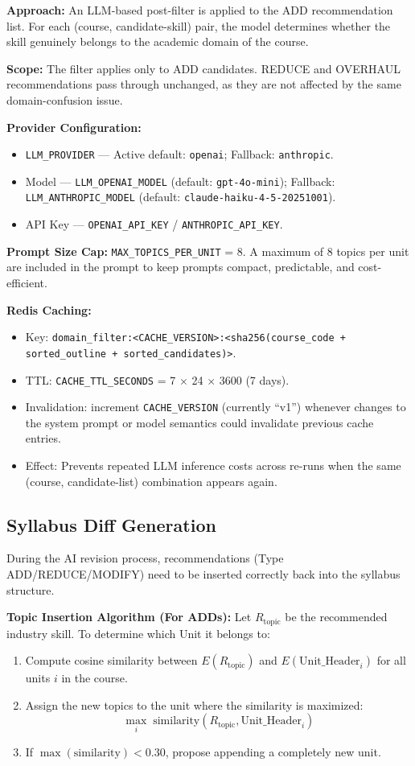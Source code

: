 \textbf{Approach:} An LLM-based post-filter is applied to the ADD recommendation list. For each (course, candidate-skill) pair, the model determines whether the skill genuinely belongs to the academic domain of the course.

\textbf{Scope:} The filter applies only to ADD candidates. REDUCE and OVERHAUL recommendations pass through unchanged, as they are not affected by the same domain-confusion issue.

\textbf{Provider Configuration:}
\begin{itemize}
    \item \texttt{LLM\_PROVIDER} --- Active default: \texttt{openai}; Fallback: \texttt{anthropic}.
    \item Model --- \texttt{LLM\_OPENAI\_MODEL} (default: \texttt{gpt-4o-mini}); Fallback: \texttt{LLM\_ANTHROPIC\_MODEL} (default: \texttt{claude-haiku-4-5-20251001}).
    \item API Key --- \texttt{OPENAI\_API\_KEY} / \texttt{ANTHROPIC\_API\_KEY}.
\end{itemize}

\textbf{Prompt Size Cap:} \texttt{MAX\_TOPICS\_PER\_UNIT} = 8. A maximum of 8 topics per unit are included in the prompt to keep prompts compact, predictable, and cost-efficient.

\textbf{Redis Caching:}
\begin{itemize}
    \item Key: \texttt{domain\_filter:<CACHE\_VERSION>:<sha256(course\_code + sorted\_outline + sorted\_candidates)>}.
    \item TTL: \texttt{CACHE\_TTL\_SECONDS} = 7 $\times$ 24 $\times$ 3600 (7 days).
    \item Invalidation: increment \texttt{CACHE\_VERSION} (currently ``v1'') whenever changes to the system prompt or model semantics could invalidate previous cache entries.
    \item Effect: Prevents repeated LLM inference costs across re-runs when the same (course, candidate-list) combination appears again.
\end{itemize}

\subsection{Syllabus Diff Generation}
During the AI revision process, recommendations (Type ADD/REDUCE/MODIFY) need to be inserted correctly back into the syllabus structure.

\textbf{Topic Insertion Algorithm (For ADDs):} Let $R_{\text{topic}}$ be the recommended industry skill. To determine which Unit it belongs to:
\begin{enumerate}
    \item Compute cosine similarity between $E(R_{\text{topic}})$ and $E(\text{Unit\_Header}_i)$ for all units $i$ in the course.
    \item Assign the new topics to the unit where the similarity is maximized:
\[
\max_i \; \text{similarity}(R_{\text{topic}}, \text{Unit\_Header}_i)
\]
    \item If $\max(\text{similarity}) < 0.30$, propose appending a completely new unit.
\end{enumerate}

